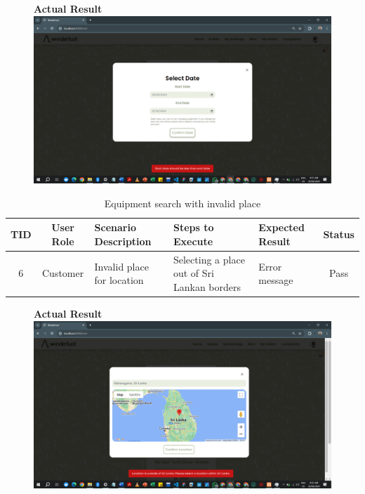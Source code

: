 \begin{figure}[h!]
    \centering
    \textbf{Actual Result}
    \includegraphics[width=1\textwidth]{Images/Test Cases/5. invalid time rent.png}
\end{figure}
\clearpage


\begin{table}[ht]
\centering
\begin{tabularx}{\textwidth}{|c|c|X|X|X|c|}
\hline
\textbf{TID} & \textbf{User Role} & \textbf{Scenario Description} & \textbf{Steps to Execute} & \textbf{Expected Result} & \textbf{Status} \\ \hline
6 & Customer & Invalid place for location & Selecting a place out of Sri Lankan borders & Error message & Pass \\ \hline
\end{tabularx}
\caption{Equipment search with invalid place}
\end{table}

\begin{figure}[h!]
    \centering
    \textbf{Actual Result}
    \includegraphics[width=1\textwidth]{Images/Test Cases/6. invalid place rent.png}
\end{figure}
\clearpage


